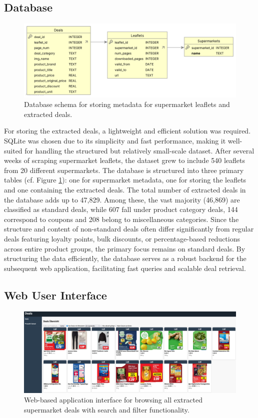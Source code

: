 \documentclass[11pt]{article}
\begin{document}
\subsection{Database}
\begin{figure}[h!]
    \centering
    \includegraphics[width=0.8\linewidth]{figures/application/db_uml.png}
    \caption{Database schema for storing metadata for supermarket leaflets and extracted deals.}
    \label{fig:application_db_uml}
\end{figure}
For storing the extracted deals, a lightweight and efficient solution was required. SQLite was chosen due to its simplicity and fast performance, making it well-suited for handling the structured but relatively small-scale dataset. After several weeks of scraping supermarket leaflets, the dataset grew to include 540 leaflets from 20 different supermarkets. The database is structured into three primary tables (cf. Figure \ref{fig:application_db_uml}): one for supermarket metadata, one for storing the leaflets and one containing the extracted deals. The total number of extracted deals in the database adds up to 47,829. Among these, the vast majority (46,869) are classified as standard deals, while 607 fall under product category deals, 144 correspond to coupons and 208 belong to miscellaneous categories. Since the structure and content of non-standard deals often differ significantly from regular deals featuring loyalty points, bulk discounts, or percentage-based reductions across entire product groups, the primary focus remains on standard deals. By structuring the data efficiently, the database serves as a robust backend for the subsequent web application, facilitating fast queries and scalable deal retrieval.

\subsection{Web User Interface}
\begin{figure}[h!]
    \centering
    \includegraphics[width=0.8\linewidth]{figures/application/deals_overview.png}
    \caption{Web-based application interface for browsing all extracted supermarket deals with search and filter functionality.}
    \label{fig:application_web_overview}
\end{figure}
\end{document}

